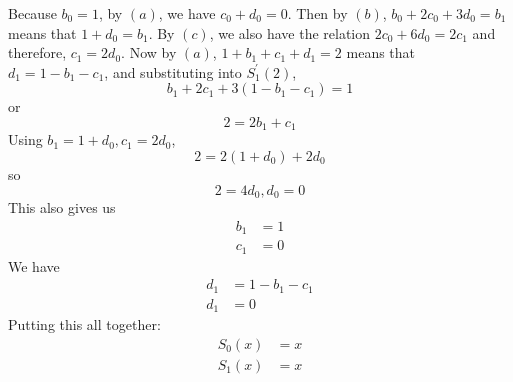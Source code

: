 \documentclass{article}
\begin{document}
\begin{answer}
        Because $b_{0} = 1$, by $(a)$, we have $c_{0} + d_{0} = 0$. Then by $(b)$, $b_{0} + 2c_{0} + 3d_{0} = b_{1}$ means that $1 + d_{0} = b_{1}$. By $(c)$, we also have the relation $2c_{0} + 6d_{0} = 2c_{1}$ and therefore, $c_{1} = 2d_{0}$. Now by $(a)$, $1 + b_{1} + c_{1} + d_{1} = 2$ means that $d_{1} = 1 - b_{1} - c_{1}$, and substituting into $S^{\prime}_{1}(2)$, 
            \begin{equation*}
                b_{1} + 2c_{1} + 3(1 - b_{1} - c_{1}) = 1
            \end{equation*}
        or
            \begin{equation*}
                2 = 2b_{1} + c_{1}
            \end{equation*}
        Using $b_{1} = 1 + d_{0}, c_{1} = 2d_{0}$,
            \begin{equation*}
                2 = 2(1 + d_{0}) + 2d_{0}
            \end{equation*}
        so
            \begin{equation*}
                2 = 4d_{0}, d_{0} = 0
            \end{equation*}
        This also gives us
            \begin{align*}
                b_{1} &= 1  \\
                c_{1} &= 0 
            \end{align*}
        We have
            \begin{align*}
                d_{1} &= 1 - b_{1} - c_{1}               \\
                d_{1} &= 0
            \end{align*}
        Putting this all together:
            \begin{align*}
                S_{0}(x) &= x                                   \\
                S_{1}(x) &= x 
            \end{align*}
    \end{answer}
\end{document}
